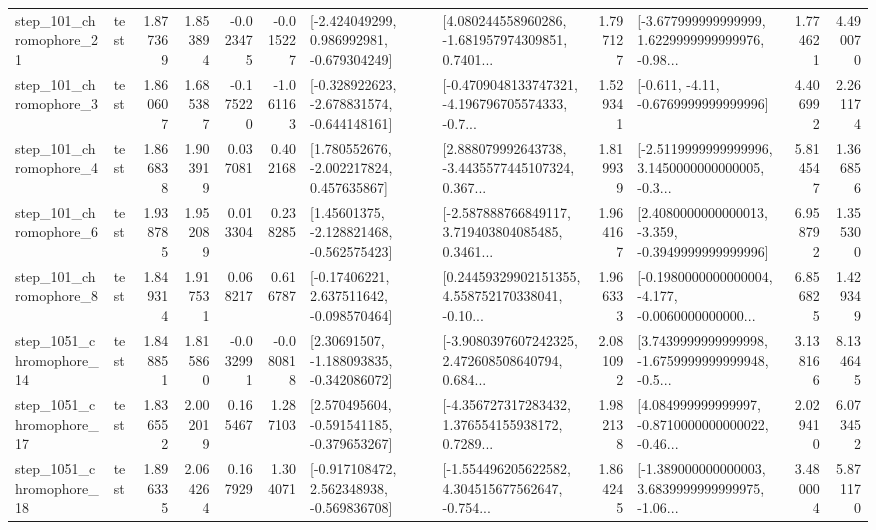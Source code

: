 \begin{tabular}{llrrrrllrlrr}
  step\_101\_chromophore\_21 &      test &      1.877369 &    1.853894 &     -0.023475 & -0.015227 &   [-2.424049299, 0.986992981, -0.679304249] &  [4.080244558960286, -1.681957974309851, 0.7401... &       1.797127 &  [-3.677999999999999, 1.6229999999999976, -0.98... &            1.774621 &          4.490070 \\
   step\_101\_chromophore\_3 &      test &      1.860607 &    1.685387 &     -0.175220 & -1.061163 &  [-0.328922623, -2.678831574, -0.644148161] &  [-0.4709048133747321, -4.196796705574333, -0.7... &       1.529341 &               [-0.611, -4.11, -0.6769999999999996] &            4.406992 &          2.261174 \\
   step\_101\_chromophore\_4 &      test &      1.866838 &    1.903919 &      0.037081 &  0.402168 &    [1.780552676, -2.002217824, 0.457635867] &  [2.888079992643738, -3.4435577445107324, 0.367... &       1.819939 &  [-2.5119999999999996, 3.1450000000000005, -0.3... &            5.814547 &          1.366856 \\
   step\_101\_chromophore\_6 &      test &      1.938785 &    1.952089 &      0.013304 &  0.238285 &    [1.45601375, -2.128821468, -0.562575423] &  [-2.587888766849117, 3.719403804085485, 0.3461... &       1.964167 &  [2.4080000000000013, -3.359, -0.3949999999999996] &            6.958792 &          1.355300 \\
   step\_101\_chromophore\_8 &      test &      1.849314 &    1.917531 &      0.068217 &  0.616787 &    [-0.17406221, 2.637511642, -0.098570464] &  [0.24459329902151355, 4.558752170338041, -0.10... &       1.966333 &  [-0.1980000000000004, -4.177, -0.0060000000000... &            6.856825 &          1.429349 \\
 step\_1051\_chromophore\_14 &      test &      1.848851 &    1.815860 &     -0.032991 & -0.080818 &    [2.30691507, -1.188093835, -0.342086072] &  [-3.9080397607242325, 2.472608508640794, 0.684... &       2.081092 &  [3.7439999999999998, -1.6759999999999948, -0.5... &            3.138166 &          8.134645 \\
 step\_1051\_chromophore\_17 &      test &      1.836552 &    2.002019 &      0.165467 &  1.287103 &   [2.570495604, -0.591541185, -0.379653267] &  [-4.356727317283432, 1.376554155938172, 0.7289... &       1.982138 &  [4.084999999999997, -0.8710000000000022, -0.46... &            2.029410 &          6.073452 \\
 step\_1051\_chromophore\_18 &      test &      1.896335 &    2.064264 &      0.167929 &  1.304071 &   [-0.917108472, 2.562348938, -0.569836708] &  [-1.554496205622582, 4.304515677562647, -0.754... &       1.864245 &  [-1.389000000000003, 3.6839999999999975, -1.06... &            3.480004 &          5.871170 \\

\end{tabular}

